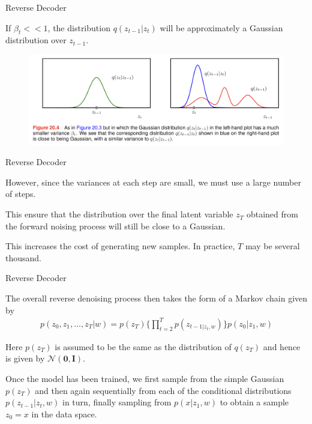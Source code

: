 \documentclass[aspectratio=169,xcolor=dvipsnames]{beamer}
\theoremstyle{named}
\begin{document}

\begin{frame}{Reverse Decoder}

If $\beta_t << 1$, the distribution $q(z_{t-1}|z_t)$ will be approximately a Gaussian distribution over $z_{t-1}$.

\begin{figure}[h!]
\centering
\includegraphics[width=130mm]{gaussian-approx.png}
\end{figure}

\end{frame}


\begin{frame}{Reverse Decoder}

However, since the variances at each step are small, we \alert{must use a large number of steps}.

\vspace{0.3cm}

This ensure that the distribution over the final latent variable $z_T$ obtained from the forward noising process will still be close to a Gaussian.

\vspace{0.3cm}

This \alert{increases the cost of generating new samples}. In practice, $T$ may be several thousand.

\end{frame}


\begin{frame}{Reverse Decoder}

The overall reverse denoising process then takes the form of a Markov chain given by
\begin{align*}
p(z_0, z_1, \dots, z_T | w) = p(z_T) \bigg\{ \prod^T_{t=2} p(z_{t-1 | z_t, w}) \bigg\} p(z_0 | z_1, w)
\end{align*}

Here $p(z_T)$ is assumed to be the same as the distribution of $q(z_T)$ and hence is given by $\mathcal{N}(\mathbf{0}, \mathbf{I})$.

\vspace{0.3cm}

Once the model has been trained, we first sample from the simple Gaussian $p(z_T)$ and then again \alert{sequentially from each of the conditional distributions $p(z_{t-1}|z_t, w)$} in turn, finally sampling from $p(x| z_1, w)$ to obtain a sample $z_0 = x$ in the data space.

\end{frame}
\end{document}
